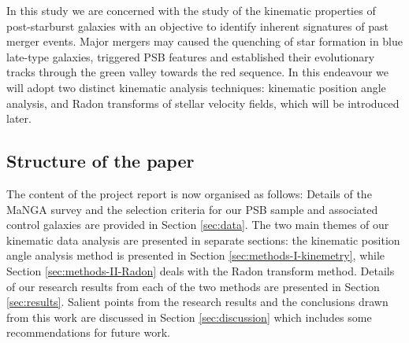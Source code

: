 In this study we are concerned with the study of the kinematic properties of post-starburst galaxies with an objective to identify inherent signatures of past merger events. Major mergers may caused the quenching of star formation in blue late-type galaxies, triggered PSB features and established their evolutionary tracks through the green valley towards the red sequence. In this endeavour we will adopt two distinct kinematic analysis techniques: kinematic position angle analysis, and Radon transforms of stellar velocity fields, which will be introduced later.

\subsection{Structure of the paper}
The content of the project report is now organised as follows: Details of the MaNGA survey and the selection criteria for our PSB sample and associated control galaxies are provided in Section \ref{sec:data}. The two main themes of our kinematic data analysis are presented in separate sections: the kinematic position angle  analysis method is presented in Section \ref{sec:methods-I-kinemetry}, while Section \ref{sec:methods-II-Radon} deals with the Radon transform method. Details of our research results from each of the two methods are presented in Section \ref{sec:results}. Salient points from the research results and the conclusions drawn from this work are discussed in Section \ref{sec:discussion} which includes some recommendations for future work.

